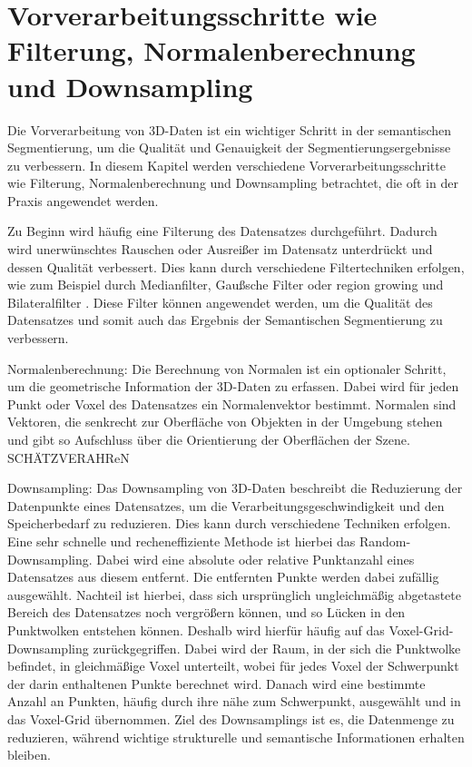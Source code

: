 \section{Vorverarbeitungsschritte wie Filterung, Normalenberechnung und Downsampling}

Die Vorverarbeitung von 3D-Daten ist ein wichtiger Schritt in der semantischen
Segmentierung, um die Qualität und Genauigkeit der Segmentierungsergebnisse zu
verbessern. In diesem Kapitel werden verschiedene Vorverarbeitungsschritte wie
Filterung, Normalenberechnung und Downsampling betrachtet, die oft in der
Praxis angewendet werden.

Zu Beginn wird häufig eine Filterung des Datensatzes durchgeführt. Dadurch wird
unerwünschtes Rauschen oder Ausreißer im Datensatz unterdrückt und dessen
Qualität verbessert. Dies kann durch verschiedene Filtertechniken erfolgen, wie
zum Beispiel durch Medianfilter, Gaußsche Filter \cite{9191237} oder region
growing und Bilateralfilter \cite{6460813}. Diese Filter können angewendet
werden, um die Qualität des Datensatzes und somit auch das Ergebnis der
Semantischen Segmentierung zu verbessern.

Normalenberechnung: Die Berechnung von Normalen ist ein optionaler Schritt, um
die geometrische Information der 3D-Daten zu erfassen. Dabei wird für jeden
Punkt oder Voxel des Datensatzes ein Normalenvektor bestimmt. Normalen sind
Vektoren, die senkrecht zur Oberfläche von Objekten in der Umgebung stehen und
gibt so Aufschluss über die Orientierung der Oberflächen der Szene.
SCHÄTZVERAHReN

Downsampling: Das Downsampling von 3D-Daten beschreibt die Reduzierung der
Datenpunkte eines Datensatzes, um die Verarbeitungsgeschwindigkeit und den
Speicherbedarf zu reduzieren. Dies kann durch verschiedene Techniken erfolgen.
Eine sehr schnelle und recheneffiziente Methode ist hierbei das
Random-Downsampling. Dabei wird eine absolute oder relative Punktanzahl eines
Datensatzes aus diesem entfernt. Die entfernten Punkte werden dabei zufällig
ausgewählt. Nachteil ist hierbei, dass sich ursprünglich ungleichmäßig
abgetastete Bereich des Datensatzes noch vergrößern können, und so Lücken in
den Punktwolken entstehen können. Deshalb wird hierfür häufig auf das
Voxel-Grid-Downsampling zurückgegriffen. Dabei wird der Raum, in der sich die
Punktwolke befindet, in gleichmäßige Voxel unterteilt, wobei für jedes Voxel
der Schwerpunkt der darin enthaltenen Punkte berechnet wird. Danach wird eine
bestimmte Anzahl an Punkten, häufig durch ihre nähe zum Schwerpunkt, ausgewählt
und in das Voxel-Grid übernommen. Ziel des Downsamplings ist es, die Datenmenge
zu reduzieren, während wichtige strukturelle und semantische Informationen
erhalten bleiben.

